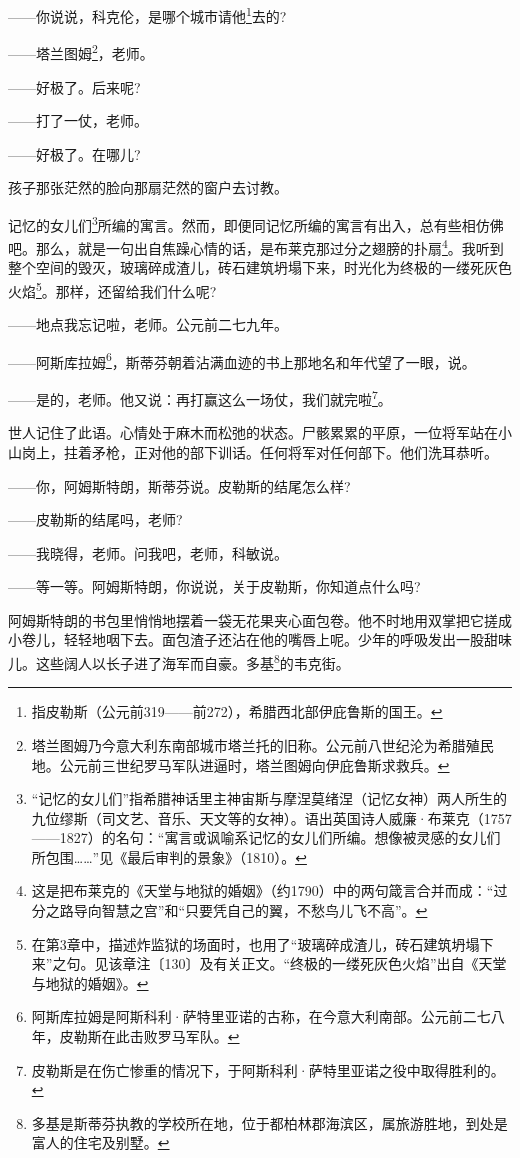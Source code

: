 \par ——你说说，科克伦，是哪个城市请他\footnote{指皮勒斯（公元前319——前272），希腊西北部伊庇鲁斯的国王。}去的?
\par ——塔兰图姆\footnote{塔兰图姆乃今意大利东南部城市塔兰托的旧称。公元前八世纪沦为希腊殖民地。公元前三世纪罗马军队进逼时，塔兰图姆向伊庇鲁斯求救兵。}，老师。
\par ——好极了。后来呢?
\par ——打了一仗，老师。
\par ——好极了。在哪儿?
\par 孩子那张茫然的脸向那扇茫然的窗户去讨教。
\par 记忆的女儿们\footnote{“记忆的女儿们”指希腊神话里主神宙斯与摩涅莫绪涅（记忆女神）两人所生的九位缪斯（司文艺、音乐、天文等的女神）。语出英国诗人威廉·布莱克（1757——1827）的名句：“寓言或讽喻系记忆的女儿们所编。想像被灵感的女儿们所包围……”见《最后审判的景象》（1810）。}所编的寓言。然而，即便同记忆所编的寓言有出入，总有些相仿佛吧。那么，就是一句出自焦躁心情的话，是布莱克那过分之翅膀的扑扇\footnote{这是把布莱克的《天堂与地狱的婚姻》（约1790）中的两句箴言合并而成：“过分之路导向智慧之宫”和“只要凭自己的翼，不愁鸟儿飞不高”。}。我听到整个空间的毁灭，玻璃碎成渣儿，砖石建筑坍塌下来，时光化为终极的一缕死灰色火焰\footnote{在第3章中，描述炸监狱的场面时，也用了“玻璃碎成渣儿，砖石建筑坍塌下来”之句。见该章注〔130〕及有关正文。“终极的一缕死灰色火焰”出自《天堂与地狱的婚姻》。}。那样，还留给我们什么呢?
\par ——地点我忘记啦，老师。公元前二七九年。
\par ——阿斯库拉姆\footnote{阿斯库拉姆是阿斯科利·萨特里亚诺的古称，在今意大利南部。公元前二七八年，皮勒斯在此击败罗马军队。}，斯蒂芬朝着沾满血迹的书上那地名和年代望了一眼，说。
\par ——是的，老师。他又说：再打赢这么一场仗，我们就完啦\footnote{皮勒斯是在伤亡惨重的情况下，于阿斯科利·萨特里亚诺之役中取得胜利的。}。
\par 世人记住了此语。心情处于麻木而松弛的状态。尸骸累累的平原，一位将军站在小山岗上，拄着矛枪，正对他的部下训话。任何将军对任何部下。他们洗耳恭听。
\par ——你，阿姆斯特朗，斯蒂芬说。皮勒斯的结尾怎么样?
\par ——皮勒斯的结尾吗，老师?
\par ——我晓得，老师。问我吧，老师，科敏说。
\par ——等一等。阿姆斯特朗，你说说，关于皮勒斯，你知道点什么吗?
\par 阿姆斯特朗的书包里悄悄地摆着一袋无花果夹心面包卷。他不时地用双掌把它搓成小卷儿，轻轻地咽下去。面包渣子还沾在他的嘴唇上呢。少年的呼吸发出一股甜味儿。这些阔人以长子进了海军而自豪。多基\footnote{多基是斯蒂芬执教的学校所在地，位于都柏林郡海滨区，属旅游胜地，到处是富人的住宅及别墅。}的韦克街。
